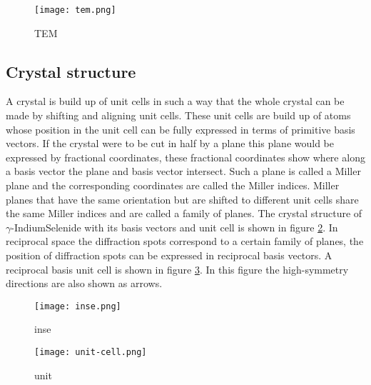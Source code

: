 

\begin{figure}
	\centering
	\texttt{[image: tem.png]}
	\caption{TEM}
	\label{fig:tem}
\end{figure}

\subsection{Crystal structure}
A crystal is build up of unit cells in such a way that the whole crystal can be made by shifting and aligning unit cells. These unit cells are build up of atoms whose position in the unit cell can be fully expressed in terms of primitive basis vectors. If the crystal were to be cut in half by a plane this plane would be expressed by fractional coordinates, these fractional coordinates show where along a basis vector the plane and basis vector intersect. Such a plane is called a Miller plane and the corresponding coordinates are called the Miller indices. Miller planes that have the same orientation but are shifted to different unit cells share the same Miller indices and are called a family of planes. The crystal structure of $\gamma$-IndiumSelenide with its basis vectors and unit cell is shown in figure \ref{fig:inse}.
In reciprocal space the diffraction spots correspond to a certain family of planes, the position of diffraction spots can be expressed in reciprocal basis vectors. A reciprocal basis unit cell is shown in figure \ref{fig:unit-cell}. In this figure the high-symmetry directions are also shown as arrows.

\begin{figure}
	\centering
	\texttt{[image: inse.png]}
	\caption{inse}
	\label{fig:inse}
\end{figure}%
\begin{figure}
	\centering
	\texttt{[image: unit-cell.png]}
	\caption{unit}
	\label{fig:unit-cell}
\end{figure}

